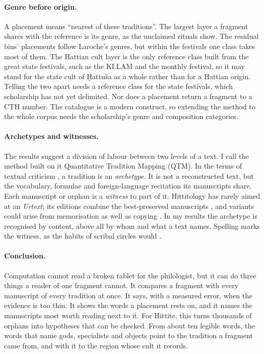 \documentclass[11pt]{article}
\newcommand{\term}[1]{\textit{#1}}
\begin{document}
\paragraph{Genre before origin.}
A placement means ``nearest of these traditions''. The largest layer a fragment shares with the
reference is its genre, as the unclaimed rituals show. The residual bins'
placements follow Laroche's genres, but within the festivals one class takes most of them. The
Hattian cult layer is the only reference class built from the great state festivals, such as the
KI.LAM and the monthly festival, so it may stand for the state cult of Ḫattuša as a whole rather
than for a Hattian origin. Telling the two apart needs a reference class for the state festivals,
which scholarship has not yet delimited. Nor does a placement return a fragment to a CTH
number. The catalogue is a modern construct, so extending the method to the whole corpus needs the
scholarship's genre and composition categories.

\paragraph{Archetypes and witnesses.}
The results suggest a division of labour between two levels of a text. I call the method built on
it Quantitative Tradition Mapping (QTM). In the terms of textual criticism
\citep{maas1958textual,trovato2014lachmann}, a tradition is an \term{archetype}. It is not a
reconstructed text, but the vocabulary, formulae and foreign-language recitation its manuscripts
share. Each manuscript or orphan is a \term{witness} to part of it. Hittitology has rarely aimed at
an \textit{Urtext}; its editions combine the best-preserved manuscripts
\citep[39f.]{christiansen2011methoden}, and variants could arise from memorisation as well as copying
\citep{marcuson2016memorization}. In my results the archetype is recognised by content, above all
by whom and what a text names. Spelling marks the witness, as the habits of scribal circles would
\citep{gordin2015scribal}.

\paragraph{Conclusion.}
Computation cannot read a broken tablet for the philologist, but it can do three things a reader
of one fragment cannot. It compares a fragment with every manuscript of every tradition at
once. It says, with a measured error, when the evidence is too thin. It shows the words a
placement rests on, and it names the manuscripts most worth reading next to it. For Hittite, this turns thousands of orphans into hypotheses that can be
checked. From about ten legible words, the words that name gods, specialists and objects point to
the tradition a fragment came from, and with it to the region whose cult it records.
\end{document}
